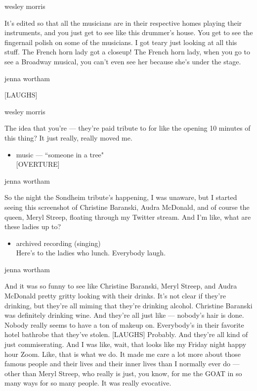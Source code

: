 wesley morris

It's edited so that all the musicians are in their respective homes
playing their instruments, and you just get to see like this drummer's
house. You get to see the fingernail polish on some of the musicians. I
got teary just looking at all this stuff. The French horn lady got a
closeup! The French horn lady, when you go to see a Broadway musical,
you can't even see her because she's under the stage.

jenna wortham

{[}LAUGHS{]}

wesley morris

The idea that you're --- they're paid tribute to for like the opening 10
minutes of this thing? It just really, really moved me.

\begin{itemize}
\tightlist
\item
  music --- ``someone in a tree"\\
  {[}OVERTURE{]}
\end{itemize}

jenna wortham

So the night the Sondheim tribute's happening, I was unaware, but I
started seeing this screenshot of Christine Baranski, Audra McDonald,
and of course the queen, Meryl Streep, floating through my Twitter
stream. And I'm like, what are these ladies up to?

\begin{itemize}
\tightlist
\item
  archived recording (singing)\\
  Here's to the ladies who lunch. Everybody laugh.
\end{itemize}

jenna wortham

And it was so funny to see like Christine Baranski, Meryl Streep, and
Audra McDonald pretty gritty looking with their drinks. It's not clear
if they're drinking, but they're all miming that they're drinking
alcohol. Christine Baranski was definitely drinking wine. And they're
all just like --- nobody's hair is done. Nobody really seems to have a
ton of makeup on. Everybody's in their favorite hotel bathrobe that
they've stolen. {[}LAUGHS{]} Probably. And they're all kind of just
commiserating. And I was like, wait, that looks like my Friday night
happy hour Zoom. Like, that is what we do. It made me care a lot more
about those famous people and their lives and their inner lives than I
normally ever do --- other than Meryl Streep, who really is just, you
know, for me the GOAT in so many ways for so many people. It was really
evocative.

